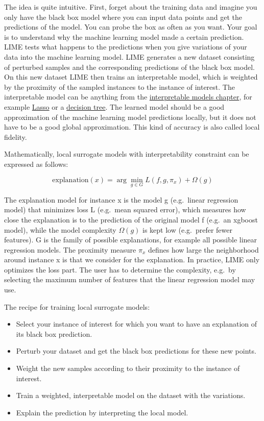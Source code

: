 \documentclass[12pt,]{krantz}
\providecommand{\tightlist}{%
  \setlength{\itemsep}{0pt}\setlength{\parskip}{0pt}}
\begin{document}
The idea is quite intuitive. First, forget about the training data and
imagine you only have the black box model where you can input data
points and get the predictions of the model. You can probe the box as
often as you want. Your goal is to understand why the machine learning
model made a certain prediction. LIME tests what happens to the
predictions when you give variations of your data into the machine
learning model. LIME generates a new dataset consisting of perturbed
samples and the corresponding predictions of the black box model. On
this new dataset LIME then trains an interpretable model, which is
weighted by the proximity of the sampled instances to the instance of
interest. The interpretable model can be anything from the
\protect\hyperlink{simple}{interpretable models chapter}, for example
\protect\hyperlink{lasso}{Lasso} or a \protect\hyperlink{tree}{decision
tree}. The learned model should be a good approximation of the machine
learning model predictions locally, but it does not have to be a good
global approximation. This kind of accuracy is also called local
fidelity.

Mathematically, local surrogate models with interpretability constraint
can be expressed as follows:

\[\text{explanation}(x)=\arg\min_{g\in{}G}L(f,g,\pi_x)+\Omega(g)\]

The explanation model for instance x is the model g (e.g.~linear
regression model) that minimizes loss L (e.g.~mean squared error), which
measures how close the explanation is to the prediction of the original
model f (e.g.~an xgboost model), while the model complexity
\(\Omega(g)\) is kept low (e.g.~prefer fewer features). G is the family
of possible explanations, for example all possible linear regression
models. The proximity measure \(\pi_x\) defines how large the
neighborhood around instance x is that we consider for the explanation.
In practice, LIME only optimizes the loss part. The user has to
determine the complexity, e.g.~by selecting the maximum number of
features that the linear regression model may use.

The recipe for training local surrogate models:

\begin{itemize}
\tightlist
\item
  Select your instance of interest for which you want to have an
  explanation of its black box prediction.
\item
  Perturb your dataset and get the black box predictions for these new
  points.
\item
  Weight the new samples according to their proximity to the instance of
  interest.
\item
  Train a weighted, interpretable model on the dataset with the
  variations.
\item
  Explain the prediction by interpreting the local model.
\end{itemize}
\end{document}
